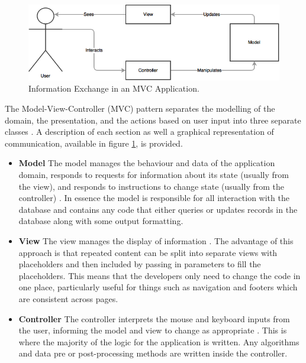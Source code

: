 \begin{figure}[H]
  \centering
  \includegraphics[width=1.0\textwidth]{Images/Research/Technologies/MVC}
  \caption{Information Exchange in an MVC Application.} \label{fig:MVC} 
\end{figure}

The Model-View-Controller (MVC) pattern separates the modelling of the domain, the presentation, and the actions based on user input into three separate classes \cite{MSDN:MVC}. A description of each section as well a graphical representation of communication, available in figure \ref{fig:MVC}, is provided.

\begin{itemize}
    \item \textbf{Model} The model manages the behaviour and data of the application domain, responds to requests for information about its state (usually from the view), and responds to instructions to change state (usually from the controller) \cite{MSDN:MVC}. In essence the model is responsible for all interaction with the database and contains any code that either queries or updates records in the database along with some output formatting.
    \item \textbf{View} The view manages the display of information \cite{MSDN:MVC}. The advantage of this approach is that repeated content can be split into separate views with placeholders and then included by passing in parameters to fill the placeholders. This means that the developers only need to change the code in one place, particularly useful for things such as navigation and footers which are consistent across pages.
    \item \textbf{Controller} The controller interprets the mouse and keyboard inputs from the user, informing the model and view to change as appropriate \cite{MSDN:MVC}. This is where the majority of the logic for the application is written. Any algorithms and data pre or post-processing methods are written inside the controller.
\end{itemize}

